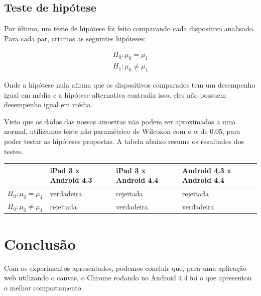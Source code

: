 \documentclass[11pt,a4paper]{article}
\begin{document}
\subsection{Teste de hipótese}\label{testedehipotese}

Por último, um teste de hipótese foi feito comparando cada dispositivo analisado. Para cada par, criamos as seguintes
hipóteses:

\begin{align*}
        H_0: \mu_0 = \mu_1 \\
        H_1: \mu_0 \neq \mu_1
\end{align*}

Onde a hipótese nula afirma que os dispositivos comparados tem um desempenho igual em média e a hipótese alternativa
contradiz isso, eles não possuem desempenho igual em média.

Visto que os dados das nossas amostras não podem ser aproximados a uma normal, utilizamos teste não paramétrico de
Wilcoxon com o \(\alpha\) de 0.05, para poder testar as hipóteses propostas. A tabela abaixo resume os resultados dos testes.

\begin{center}
    \begin{tabular}{| l | l | l | l |}
    \hline
     & iPad 3 x Android 4.3 & iPad 3 x Android 4.4 & Android 4.3 x Android 4.4 \\ \hline
    \( H_0: \mu_0 = \mu_1 \) & verdadeira & rejeitada & rejeitada \\ \hline
    \( H_0: \mu_0 \neq \mu_1 \) & rejeitada & verdadeira & verdadeira \\ \hline
    \end{tabular}
\end{center}

\section{Conclusão}\label{conclusao}

Com os experimentos apresentados, podemos concluir que, para uma aplicação web utilizando o canvas, o Chrome rodando no
Android 4.4 foi o que apresentou o melhor compartamento



\end{document}
